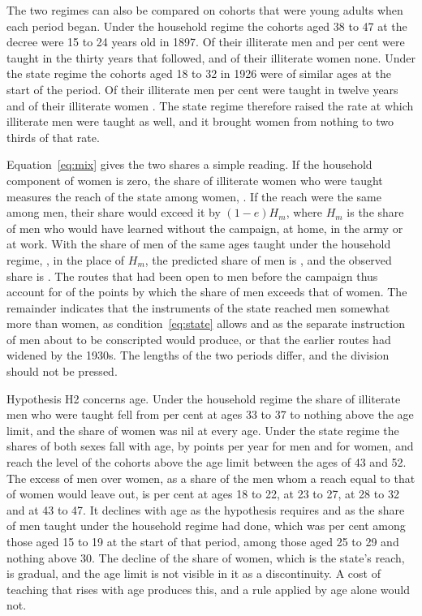 The two regimes can also be compared on cohorts that were young adults when each period began. Under the household regime the cohorts aged 38 to 47 at the decree were 15 to 24 years old in 1897. Of their illiterate men  and  per cent were taught in the thirty years that followed, and of their illiterate women none. Under the state regime the cohorts aged 18 to 32 in 1926 were of similar ages at the start of the period. Of their illiterate men  per cent were taught in twelve years and of their illiterate women . The state regime therefore raised the rate at which illiterate men were taught as well, and it brought women from nothing to two thirds of that rate.

Equation~\eqref{eq:mix} gives the two shares a simple reading. If the household component of women is zero, the share of illiterate women who were taught measures the reach of the state among women, . If the reach were the same among men, their share would exceed it by $(1-e)H_m$, where $H_m$ is the share of men who would have learned without the campaign, at home, in the army or at work. With the share of men of the same ages taught under the household regime, , in the place of $H_m$, the predicted share of men is , and the observed share is . The routes that had been open to men before the campaign thus account for  of the  points by which the share of men exceeds that of women. The remainder indicates that the instruments of the state reached men somewhat more than women, as condition~\eqref{eq:state} allows and as the separate instruction of men about to be conscripted would produce, or that the earlier routes had widened by the 1930s. The lengths of the two periods differ, and the division should not be pressed.

Hypothesis H2 concerns age. Under the household regime the share of illiterate men who were taught fell from  per cent at ages 33 to 37 to nothing above the age limit, and the share of women was nil at every age. Under the state regime the shares of both sexes fall with age, by  points per year for men and  for women, and reach the level of the cohorts above the age limit between the ages of 43 and 52. The excess of men over women, as a share of the men whom a reach equal to that of women would leave out, is  per cent at ages 18 to 22,  at 23 to 27,  at 28 to 32 and  at 43 to 47. It declines with age as the hypothesis requires and as the share of men taught under the household regime had done, which was  per cent among those aged 15 to 19 at the start of that period,  among those aged 25 to 29 and nothing above 30. The decline of the share of women, which is the state's reach, is gradual, and the age limit is not visible in it as a discontinuity. A cost of teaching that rises with age produces this, and a rule applied by age alone would not.

